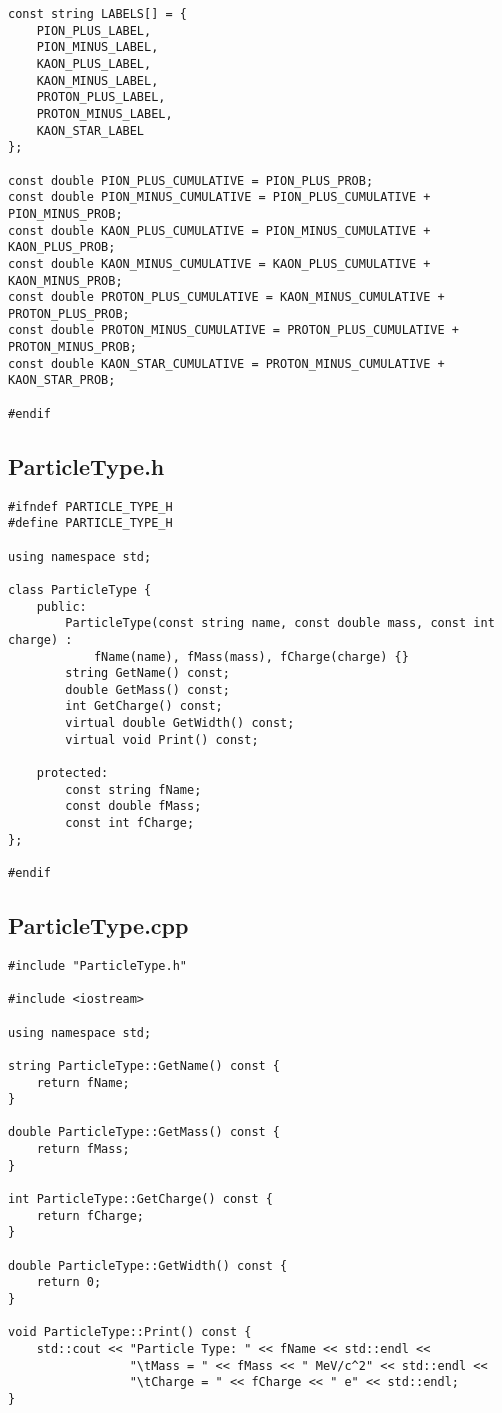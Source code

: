 \documentclass{article}
\begin{document}
\begin{verbatim}
const string LABELS[] = {
    PION_PLUS_LABEL,
    PION_MINUS_LABEL,
    KAON_PLUS_LABEL,
    KAON_MINUS_LABEL,
    PROTON_PLUS_LABEL,
    PROTON_MINUS_LABEL,
    KAON_STAR_LABEL
};

const double PION_PLUS_CUMULATIVE = PION_PLUS_PROB;
const double PION_MINUS_CUMULATIVE = PION_PLUS_CUMULATIVE + PION_MINUS_PROB;
const double KAON_PLUS_CUMULATIVE = PION_MINUS_CUMULATIVE + KAON_PLUS_PROB;
const double KAON_MINUS_CUMULATIVE = KAON_PLUS_CUMULATIVE + KAON_MINUS_PROB;
const double PROTON_PLUS_CUMULATIVE = KAON_MINUS_CUMULATIVE + PROTON_PLUS_PROB;
const double PROTON_MINUS_CUMULATIVE = PROTON_PLUS_CUMULATIVE + PROTON_MINUS_PROB;
const double KAON_STAR_CUMULATIVE = PROTON_MINUS_CUMULATIVE + KAON_STAR_PROB;

#endif
\end{verbatim}

\subsection*{ParticleType.h}
\begin{verbatim}
#ifndef PARTICLE_TYPE_H
#define PARTICLE_TYPE_H

using namespace std;

class ParticleType {
    public:
        ParticleType(const string name, const double mass, const int charge) :
            fName(name), fMass(mass), fCharge(charge) {}
        string GetName() const;
        double GetMass() const;
        int GetCharge() const;
        virtual double GetWidth() const;
        virtual void Print() const;

    protected:
        const string fName;
        const double fMass;
        const int fCharge;
};

#endif
\end{verbatim}

\subsection*{ParticleType.cpp}
\begin{verbatim}
#include "ParticleType.h"

#include <iostream>

using namespace std;

string ParticleType::GetName() const {
    return fName;
}

double ParticleType::GetMass() const {
    return fMass;
}

int ParticleType::GetCharge() const {
    return fCharge;
}

double ParticleType::GetWidth() const {
    return 0;
}

void ParticleType::Print() const {
    std::cout << "Particle Type: " << fName << std::endl <<
                 "\tMass = " << fMass << " MeV/c^2" << std::endl <<
                 "\tCharge = " << fCharge << " e" << std::endl;
}
\end{verbatim}
\end{document}
